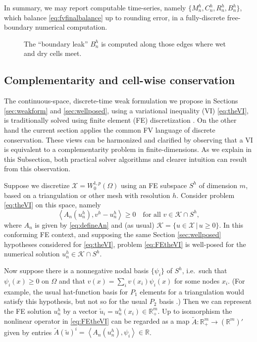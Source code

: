 \documentclass[final,onefignum]{siamart190516}
\newcommand{\ip}[2]{\ensuremath{\left<#1,#2\right>}}
\newcommand\RR{\mathbb{R}}
\begin{document}
In summary, we may report computable time-series, namely $\{M_n^h,C_n^h,R_n^h,B_n^h\}$, which balance \eqref{eq:fvfinalbalance} up to rounding error, in a fully-discrete free-boundary numerical computation.

\begin{figure}[ht]
\begin{center}

\end{center}
\caption{The ``boundary leak'' $B_n^h$ is computed along those edges where wet and dry cells meet.}
\label{fig:fvmesh-leak}
\end{figure}


\subsection{Complementarity and cell-wise conservation}  \label{subsec:ncp}

The continuous-space, discrete-time weak formulation we propose in Sections \ref{sec:weakform} and \ref{sec:wellposed}, using a variational inequality (VI) \eqref{eq:theVI}, is traditionally solved using finite element (FE) discretization \cite[for example]{CalvoDuranyVazquez2000,JouvetBueler2012,
JouvetBuelerGraeserKornhuber2013}.  On the other hand the current section applies the common FV language of discrete conservation.  These views can be harmonized and clarified by observing that a VI is equivalent to a complementarity problem \cite{FacchineiPang2003,KinderlehrerStampacchia1980} in finite-dimensions.  As we explain in this Subsection, both practical solver algorithms and clearer intuition can result from this observation.

Suppose we discretize $\mathcal{X} = W_0^{1,p}(\Omega)$ using an FE subspace $S^h$ of dimension $m$, based on a triangulation or other mesh with resolution $h$.  Consider problem \eqref{eq:theVI} on this space, namely
\begin{equation}
\ip{A_n(u_n^h)}{v^h-u_n^h} \ge 0 \quad \text{for all } v \in \mathcal{K} \cap S^h,   \label{eq:FEtheVI}
\end{equation}
where $A_n$ is given by \eqref{eq:defineAn} and (as usual) $\mathcal{K} = \{u\in \mathcal{X}\,\big|\,u\ge 0\}$.  In this conforming FE context, and supposing the same Section \ref{sec:wellposed} hypotheses considered for \eqref{eq:theVI}, problem \eqref{eq:FEtheVI} is well-posed for the numerical solution $u_n^h \in \mathcal{K} \cap S^h$.

Now suppose there is a nonnegative nodal basis $\{\psi_i\}$ of $S^h$, i.e.~such that $\psi_i(x)\ge 0$ on $\Omega$ and that $v(x) = \sum_i v(x_i) \psi_i(x)$ for some nodes $x_i$.  (For example, the usual hat-function basis for $P_1$ elements for a triangulation would satisfy this hypothesis, but not so for the usual $P_2$ basis \cite{Elmanetal2014}.)  Then we can represent the FE solution $u_n^h$ by a vector $\tilde u_i = u_n^h(x_i) \in \RR_+^m$.  Up to isomorphism the nonlinear operator in \eqref{eq:FEtheVI} can be regarded as a map $\tilde A:\RR_+^m \to (\RR^m)'$ given by entries $\tilde A(\tilde u)^i = \ip{A_n(u_n^h)}{\psi_i} \in \RR$.
\end{document}
